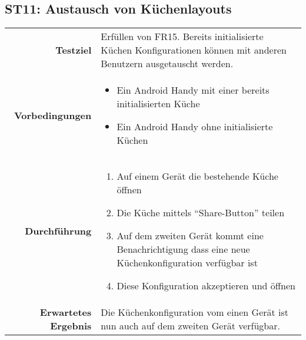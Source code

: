 \subsection{ST11: Austausch von Küchenlayouts}
\begin{table}[H]
\begin{tabularx}{\textwidth}{r X }
\textbf{Testziel} & Erfüllen von \ac{FR}15. Bereits initialisierte Küchen Konfigurationen können mit anderen Benutzern ausgetauscht werden. \\
\textbf{Vorbedingungen} & \begin{itemize}
\item Ein Android Handy mit einer bereits initialisierten Küche
\item Ein Android Handy ohne initialisierte Küchen
\end{itemize} \\
\textbf{Durchführung} & \begin{enumerate}
\item Auf einem Gerät die bestehende Küche öffnen
\item Die Küche mittels \enquote{Share-Button} teilen
\item Auf dem zweiten Gerät kommt eine Benachrichtigung dass eine neue Küchenkonfiguration verfügbar ist
\item Diese Konfiguration akzeptieren und öffnen
\end{enumerate} \\
\textbf{Erwartetes Ergebnis} & Die Küchenkonfiguration vom einen Gerät ist nun auch auf dem zweiten Gerät verfügbar.\\
\end{tabularx}
\end{table}

